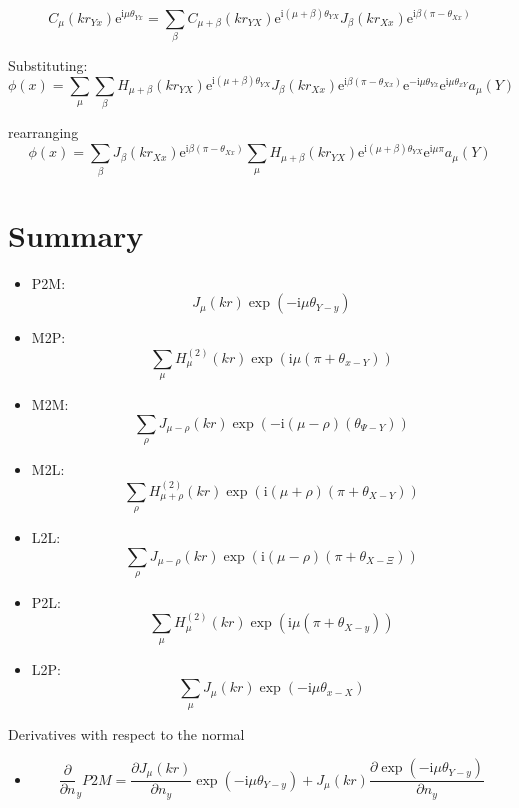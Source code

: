 \documentclass[11pt,a4paper]{article}
\newcommand{\ti}{\mathrm{i}}
\newcommand{\te}{\mathrm{e}}
\begin{document}
\begin{equation}
	C_{\mu}(k r_{Yx})
	\te^{\ti \mu \theta_{Yx}}
	=
	\sum_{\beta} C_{\mu + \beta}(k r_{YX})
	\te^{\ti (\mu + \beta) \theta_{YX}}
	J_{\beta}(k r_{Xx})
	\te^{\ti \beta(\pi-\theta_{Xx})}
\end{equation}


Substituting:
%
\begin{equation}
	\phi(x)
	=
	\sum_{\mu}
%	
	\sum_{\beta}
	H_{\mu + \beta}(k r_{YX})
	\te^{\ti (\mu + \beta) \theta_{YX}}
	J_{\beta}(k r_{Xx})
	\te^{\ti \beta(\pi-\theta_{Xx})}
	\te^{-\ti \mu \theta_{Yx}}
%	
	\te^{\ti \mu \theta_{xY}}
	a_{\mu}(Y)
	\label{eq:far_field}
\end{equation}

rearranging
%
\begin{equation}
	\phi(x)
	=
	\sum_{\beta}
	J_{\beta}(k r_{Xx})
	\te^{\ti \beta(\pi-\theta_{Xx})}
%	
	\sum_{\mu}
	H_{\mu + \beta}(k r_{YX})
	\te^{\ti (\mu + \beta) \theta_{YX}}
	\te^{\ti \mu \pi}
	a_{\mu}(Y)
	\label{eq:far_field}
\end{equation}

\section{Summary}

\begin{itemize}
	\item P2M:
	\begin{equation}
		J_{\mu}(kr) \exp(-\ti\mu\theta_{Y-y})
	\end{equation}
	\item M2P:
	\begin{equation}
		\sum_{\mu} H^{(2)}_{\mu}(kr) \exp(\ti\mu(\pi+\theta_{x-Y}))
	\end{equation}
	\item M2M:
	\begin{equation}
		\sum_{\rho} J_{\mu-\rho}(kr) \exp(-\ti(\mu-\rho)(\theta_{\Psi-Y}))
	\end{equation}
	\item M2L:
	\begin{equation}
		\sum_{\rho} H^{(2)}_{\mu + \rho}(kr) \exp(\ti(\mu + \rho)  (\pi + \theta_{X-Y}))
	\end{equation}
	\item L2L:
	\begin{equation}
		\sum_{\rho} J_{\mu - \rho}(kr) \exp(\ti(\mu - \rho)(\pi+\theta_{X-\Xi}))
	\end{equation}
	\item P2L:
	\begin{equation}
		\sum_{\mu} H^{(2)}_{\mu}(kr) \exp(\ti\mu(\pi+\theta_{X-y}))
	\end{equation}
	\item L2P:
	\begin{equation}
		\sum_{\mu} J_{\mu}(kr) \exp(-\ti\mu\theta_{x-X})
	\end{equation}
\end{itemize}

Derivatives with respect to the normal
\begin{itemize}
	\item 
	\begin{equation}
		\frac{\partial}{\partial n}_y P2M
		=
		\frac{\partial J_{\mu}(kr)}{\partial n_y}  \exp(-\ti\mu\theta_{Y-y})
		+
		J_{\mu}(kr) \frac{\partial \exp(-\ti\mu\theta_{Y-y})}{\partial n_y}
	\end{equation}
\end{itemize}
\end{document}
